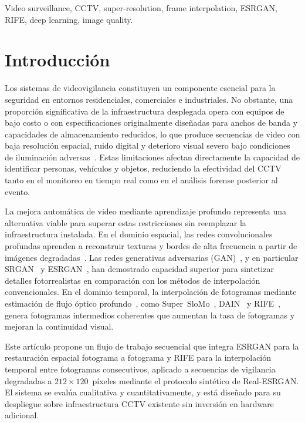 \documentclass[conference]{IEEEtran}
\begin{document}
\begin{IEEEkeywords}
Video surveillance, CCTV, super-resolution, frame interpolation, ESRGAN, RIFE, deep learning, image quality.
\end{IEEEkeywords}

\section{Introducción}

Los sistemas de videovigilancia constituyen un componente esencial para la seguridad en entornos residenciales, comerciales e industriales. No obstante, una proporción significativa de la infraestructura desplegada opera con equipos de bajo costo o con especificaciones originalmente diseñadas para anchos de banda y capacidades de almacenamiento reducidos, lo que produce secuencias de video con baja resolución espacial, ruido digital y deterioro visual severo bajo condiciones de iluminación adversas~\cite{li2011people}. Estas limitaciones afectan directamente la capacidad de identificar personas, vehículos y objetos, reduciendo la efectividad del CCTV tanto en el monitoreo en tiempo real como en el análisis forense posterior al evento.

La mejora automática de video mediante aprendizaje profundo representa una alternativa viable para superar estas restricciones sin reemplazar la infraestructura instalada. En el dominio espacial, las redes convolucionales profundas aprenden a reconstruir texturas y bordes de alta frecuencia a partir de imágenes degradadas~\cite{dong2014srcnn, vanouwerkerk2006survey}. Las redes generativas adversarias (GAN)~\cite{goodfellow2014gan}, y en particular SRGAN~\cite{ledig2017srgan} y ESRGAN~\cite{wang2018esrgan}, han demostrado capacidad superior para sintetizar detalles fotorrealistas en comparación con los métodos de interpolación convencionales. En el dominio temporal, la interpolación de fotogramas mediante estimación de flujo óptico profundo~\cite{dosovitskiy2015flownet}, como Super~SloMo~\cite{jiang2018superslomo}, DAIN~\cite{bao2019dain} y RIFE~\cite{huang2022rife}, genera fotogramas intermedios coherentes que aumentan la tasa de fotogramas y mejoran la continuidad visual.

Este artículo propone un flujo de trabajo secuencial que integra ESRGAN para la restauración espacial fotograma a fotograma y RIFE para la interpolación temporal entre fotogramas consecutivos, aplicado a secuencias de vigilancia degradadas a $212\times120$~píxeles mediante el protocolo sintético de Real-ESRGAN. El sistema se evalúa cualitativa y cuantitativamente, y está diseñado para su despliegue sobre infraestructura CCTV existente sin inversión en hardware adicional.
\end{document}
